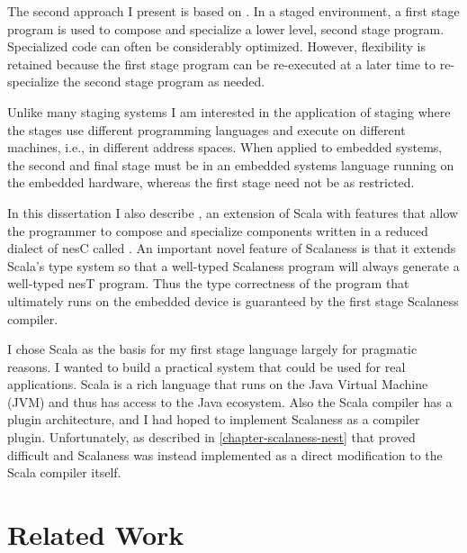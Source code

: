 The second approach I present is based on 
\cite{Taha-MetaML,Sheard-TemplateHaskell,Mainland-Flask-2008,FramedML}. In a staged environment,
a first stage program is used to compose and specialize a lower level, second stage program.
Specialized code can often be considerably optimized. However, flexibility is retained because
the first stage program can be re-executed at a later time to re-specialize the second stage
program as needed.

Unlike many staging systems I am interested in the application of staging where the stages use
different programming languages and execute on different machines, i.e., in different address
spaces. When applied to embedded systems, the second and final stage must be in an embedded
systems language running on the embedded hardware, whereas the first stage need not be as
restricted.

In this dissertation I also describe  \cite{chapin-GPCE-2013}, an extension
of Scala \cite{PiS2} with features that allow the programmer to compose and specialize
components written in a reduced dialect of nesC called . An important novel
feature of Scalaness is that it extends Scala's type system so that a well-typed Scalaness
program will always generate a well-typed nesT program. Thus the type correctness of the program
that ultimately runs on the embedded device is guaranteed by the first stage Scalaness compiler.

I chose Scala as the basis for my first stage language largely for pragmatic reasons. I wanted
to build a practical system that could be used for real applications. Scala is a rich language
that runs on the Java Virtual Machine (JVM) and thus has access to the Java ecosystem. Also the
Scala compiler has a plugin architecture, and I had hoped to implement Scalaness as a compiler
plugin. Unfortunately, as described in \autoref{chapter-scalaness-nest} that proved difficult
and Scalaness was instead implemented as a direct modification to the Scala compiler itself.

\section{Related Work}



